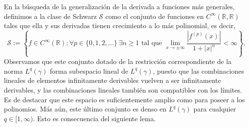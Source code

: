 \documentclass[letterpaper,twoside,12pt]{book}
\newcommand{\R}{\mathbb{R}}
\newcommand{\1}{\mathds{1}}
\renewcommand{\to}{\rightarrow}
\theoremstyle{definition}
\theoremstyle{definition}
\theoremstyle{remark}
\theoremstyle{definition}
\theoremstyle{definition}
\theoremstyle{definition}
\theoremstyle{definition}
\theoremstyle{definition}
\begin{document}
En la búsqueda de la generalización de la derivada a funciones más generales, definimos a la clase de Schwarz $\mathcal{S}$ como el conjunto de funciones en $C^{\infty}(\R,\R)$ tales que ella y sus derivadas tienen crecimiento a lo más polinomial, es decir,
\[
\mathcal{S}:=\left\{f\in C^{\infty}(\R) : \forall p\in \{0,1,2,...\} \ \exists n\geq1 \text{ tal que }\lim_{x\to\pm\infty}\frac{|f^{(p)}(x)|}{1+|x|^{n}}<\infty \right\}.    
\]
Observamos que este conjunto dotado de la restricción correspondiente de la norma $L^q(\gamma)$ forma subespacio lineal de $L^{q}(\gamma)$, puesto que las combinaciones lineales de elementos infinitamente derivables vuelven a ser infinitamente derivables, y las combinaciones lineales también son compatibles con los límites. Es de destacar que este espacio es suficientemente amplio como para poseer a los polinomios. Más aún, este último conjunto es denso en $L^{q}(\gamma)$ para cualquier $q\in [1,\infty)$. Esto es consecuencia del siguiente lema.
\end{document}

